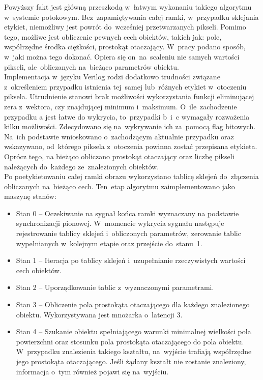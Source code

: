 Powyższy fakt jest główną przeszkodą w~łatwym wykonaniu takiego algorytmu w~systemie potokowym. Bez~zapamiętywania całej ramki, w~przypadku sklejania etykiet, niemożliwy jest powrót do~wcześniej przetwarzanych pikseli. Pomimo tego, możliwe jest obliczenie pewnych cech obiektów, takich jak: pole, współrzędne środka ciężkości, prostokąt otaczający. W~pracy \cite{COG} podano sposób, w~jaki można tego dokonać. Opiera się on~na~scaleniu nie samych wartości pikseli, ale~obliczanych na~bieżąco parametrów obiektu.\\ Implementacja w~języku Verilog rodzi dodatkowo trudności związane z~określeniem przypadku istnienia tej~samej lub~różnych etykiet w~otoczeniu piksela. Utrudnienie stanowi brak możliwości wykorzystania funkcji eliminującej zera z~wektora, czy znajdującej minimum i~maksimum. O~ile~zachodzenie przypadku a jest łatwe do wykrycia, to~przypadki b~i~c wymagały rozważenia kilku możliwości. Zdecydowano się na~wykrywanie ich za~pomocą flag bitowych. Na~ich podstawie wnioskowano o~zachodzącym aktualnie przypadku oraz wskazywano, od~którego piksela z~otoczenia powinna zostać przepisana etykieta. Oprócz tego, na bieżąco obliczano prostokąt otaczający oraz liczbę pikseli należących do~każdego ze~znalezionych obiektów.\\
Po poetykietowaniu całej ramki obrazu wykorzystano tablicę sklejeń do~złączenia obliczanych na~bieżąco cech. Ten~etap algorytmu zaimplementowano jako maszynę stanów:
\begin{itemize}
	\item Stan 0 -- Oczekiwanie na sygnał końca ramki wyznaczany na podstawie synchronizacji pionowej. W~momencie wykrycia sygnału następuje rejestrowanie tablicy sklejeń i~obliczonych parametrów, zerowanie tablic wypełnianych w~kolejnym etapie oraz przejście do~stanu~1.
	\item Stan 1 -- Iteracja po tablicy sklejeń i~uzupełnianie rzeczywistych wartości cech obiektów.
	\item Stan 2 -- Uporządkowanie tablic z~wyznaczonymi parametrami.
	\item Stan 3 -- Obliczenie pola prostokąta otaczającego dla każdego znalezionego obiektu. Wykorzystywana jest mnożarka o~latencji 3.
	\item Stan 4 -- Szukanie obiektu spełniającego warunki minimalnej wielkości pola powierzchni oraz stosunku pola prostokąta otaczającego do pola obiektu. W~przypadku znalezienia takiego kształtu, na~wyjście trafiają współrzędne jego prostokąta otaczającego. Jeśli żądany kształt nie zostanie znaleziony, informacja o~tym również pojawi się na~wyjściu.
\end{itemize}
